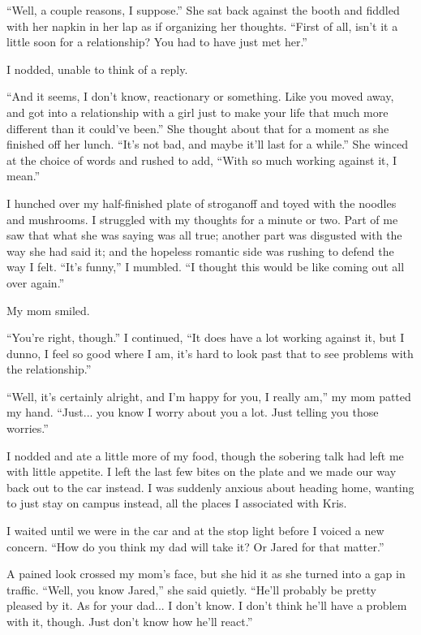 ``Well, a couple reasons, I suppose.''  She sat back against the booth and fiddled with her napkin in her lap as if organizing her thoughts.  ``First of all, isn't it a little soon for a relationship?  You had to have just met her.''

I nodded, unable to think of a reply.

``And it seems, I don't know, reactionary or something.  Like you moved away, and got into a relationship with a girl just to make your life that much more different than it could've been.''  She thought about that for a moment as she finished off her lunch.  ``It's not bad, and maybe it'll last for a while.''  She winced at the choice of words and rushed to add, ``With so much working against it, I mean.''

I hunched over my half-finished plate of stroganoff and toyed with the noodles and mushrooms.  I struggled with my thoughts for a minute or two.  Part of me saw that what she was saying was all true; another part was disgusted with the way she had said it; and the hopeless romantic side was rushing to defend the way I felt.  ``It's funny,'' I mumbled.  ``I thought this would be like coming out all over again.''

My mom smiled.

``You're right, though.''  I continued, ``It does have a lot working against it, but I dunno, I feel so good where I am, it's hard to look past that to see problems with the relationship.''


``Well, it's certainly alright, and I'm happy for you, I really am,'' my mom patted my hand.  ``Just... you know I worry about you a lot.  Just telling you those worries.''

I nodded and ate a little more of my food, though the sobering talk had left me with little appetite.  I left the last few bites on the plate and we made our way back out to the car instead.  I was suddenly anxious about heading home, wanting to just stay on campus instead, all the places I associated with Kris.

I waited until we were in the car and at the stop light before I voiced a new concern.  ``How do you think my dad will take it?  Or Jared for that matter.''

A pained look crossed my mom's face, but she hid it as she turned into a gap in traffic.  ``Well, you know Jared,'' she said quietly.  ``He'll probably be pretty pleased by it.  As for your dad... I don't know.  I don't think he'll have a problem with it, though.  Just don't know how he'll react.''

